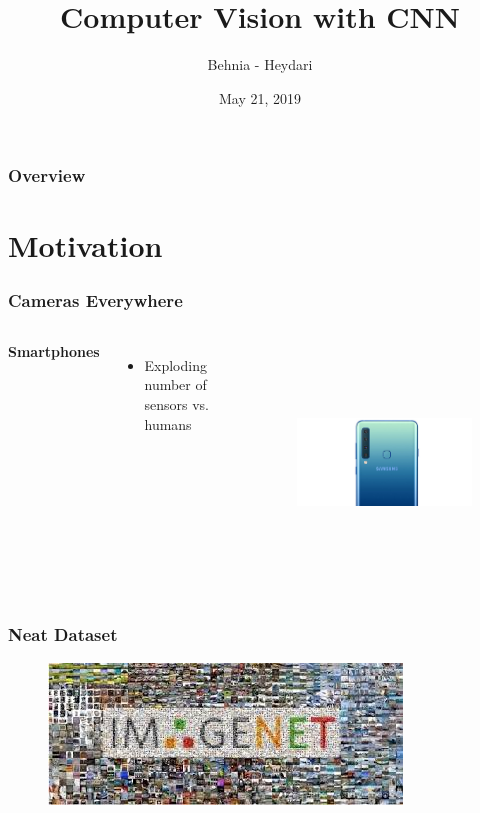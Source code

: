 \documentclass{beamer}
\title[YOLO]{Computer Vision with CNN}
\author{Behnia - Heydari}
\institute[AUT]
{
Amirkabir University of Technology \\ 
\medskip
\textit{}
}
\date{May 21, 2019}
\begin{document}
\begin{frame}
\titlepage
\end{frame}

\begin{frame}
\frametitle{Overview}
\tableofcontents
\end{frame}

\section{Motivation}

\begin{frame}
\frametitle{Cameras Everywhere}
\begin{columns}[c]

\textbf{Smartphones}
\begin{itemize}
\item Exploding number of sensors vs. humans

\end{itemize}

\begin{figure}
	\includegraphics[height=180pt]{Pics/samsung.jpg}
\end{figure}
\end{columns}
\end{frame}

\begin{frame}
	\frametitle{Neat Dataset}
	\begin{figure}
		\includegraphics[width=\linewidth]{Pics/image_net.jpeg}
	\end{figure}
\end{frame}
\end{document}
